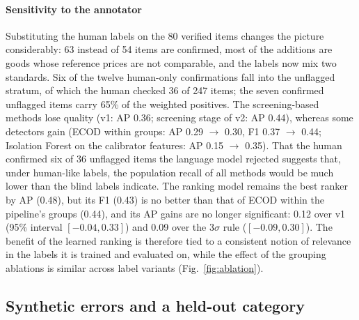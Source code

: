 \documentclass[conference]{IEEEtran}
\begin{document}
\paragraph{Sensitivity to the annotator} Substituting the human labels on the 80 verified items changes
the picture considerably: 63 instead of 54 items are confirmed, most of the additions are goods whose
reference prices are not comparable, and the labels now mix two standards. Six of the twelve human-only
confirmations fall into the unflagged stratum, of which the human checked 36 of 247 items; the seven
confirmed unflagged items carry 65\% of the weighted positives. The screening-based methods lose quality
(v1: AP 0.36; screening stage of v2: AP 0.44), whereas some detectors gain (ECOD within groups: AP 0.29
$\to$ 0.30, F1 0.37 $\to$ 0.44; Isolation Forest on the calibrator features: AP 0.15 $\to$ 0.35). That the
human confirmed six of 36 unflagged items the language model rejected suggests that, under human-like
labels, the population recall of all methods would be much lower than the blind labels indicate. The ranking model remains the best ranker by AP (0.48), but its F1 (0.43) is no better than that
of ECOD within the pipeline's groups (0.44), and its AP gains are no longer significant: 0.12 over v1
(95\% interval $[-0.04, 0.33]$) and 0.09 over the 3$\sigma$ rule ($[-0.09, 0.30]$). The benefit of the learned ranking is therefore tied to a consistent notion of relevance
in the labels it is trained and evaluated on, while the effect of the grouping ablations is similar across
label variants (Fig.~\ref{fig:ablation}).

\subsection{Synthetic errors and a held-out category}
\end{document}
